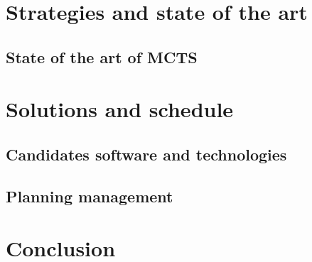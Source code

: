 \documentclass[12pt]{article}
\begin{document}
\newpage
\section{Strategies and state of the art}

\subsection{State of the art of MCTS}

\newpage
\section{Solutions and schedule}
\subsection{Candidates software and technologies}
\subsection {Planning management} 
\newpage
\section{Conclusion}

\newpage


\end{document}
